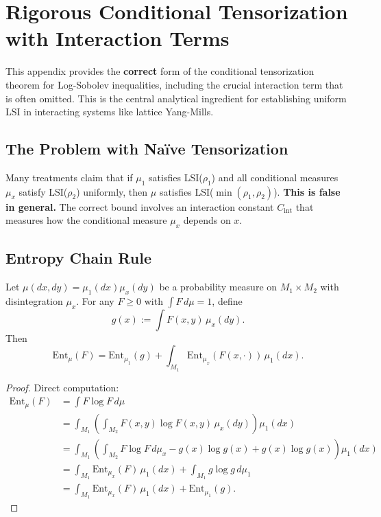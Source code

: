 \section{Rigorous Conditional Tensorization with Interaction Terms}
\label{sec:rigorous-conditional-tensorization}

This appendix provides the \textbf{correct} form of the conditional tensorization theorem for Log-Sobolev inequalities, including the crucial interaction term that is often omitted. This is the central analytical ingredient for establishing uniform LSI in interacting systems like lattice Yang-Mills.

\subsection{The Problem with Na\"ive Tensorization}

\begin{warning}
Many treatments claim that if $\mu_1$ satisfies LSI($\rho_1$) and all conditional measures $\mu_x$ satisfy LSI($\rho_2$) uniformly, then $\mu$ satisfies LSI($\min(\rho_1, \rho_2)$). \textbf{This is false in general.} The correct bound involves an interaction constant $C_{\mathrm{int}}$ that measures how the conditional measure $\mu_x$ depends on $x$.
\end{warning}

\subsection{Entropy Chain Rule}

\begin{lemma}\label{lem:entropy-chain}
Let $\mu(dx,dy) = \mu_1(dx) \mu_x(dy)$ be a probability measure on $M_1 \times M_2$ with disintegration $\mu_x$. For any $F \geq 0$ with $\int F \, d\mu = 1$, define
\begin{equation}
    g(x) := \int F(x,y) \, \mu_x(dy).
\end{equation}
Then
\begin{equation}
    \mathrm{Ent}_\mu(F) = \mathrm{Ent}_{\mu_1}(g) + \int_{M_1} \mathrm{Ent}_{\mu_x}(F(x,\cdot)) \, \mu_1(dx).
\end{equation}
\end{lemma}

\begin{proof}
Direct computation:
\begin{align}
    \mathrm{Ent}_\mu(F) &= \int F \log F \, d\mu \\
    &= \int_{M_1} \left( \int_{M_2} F(x,y) \log F(x,y) \, \mu_x(dy) \right) \mu_1(dx) \\
    &= \int_{M_1} \left( \int_{M_2} F \log F \, d\mu_x - g(x) \log g(x) + g(x) \log g(x) \right) \mu_1(dx) \\
    &= \int_{M_1} \mathrm{Ent}_{\mu_x}(F) \, \mu_1(dx) + \int_{M_1} g \log g \, d\mu_1 \\
    &= \int_{M_1} \mathrm{Ent}_{\mu_x}(F) \, \mu_1(dx) + \mathrm{Ent}_{\mu_1}(g).
\end{align}
\end{proof}

